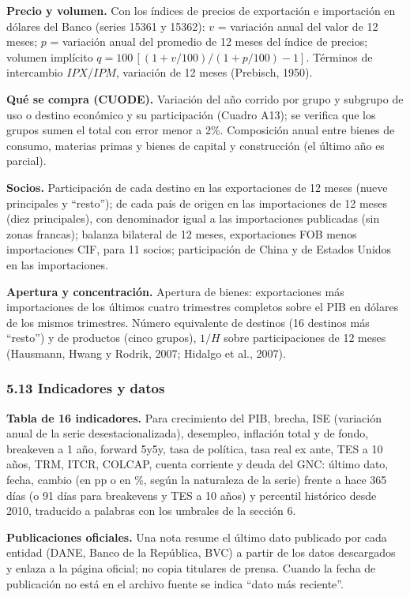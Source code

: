 \textbf{Precio y volumen.} Con los índices de precios de exportación e
importación en dólares del Banco (series 15361 y 15362): \(v\) =
variación anual del valor de 12 meses; \(p\) = variación anual del
promedio de 12 meses del índice de precios; volumen implícito
\(q=100\,[(1+v/100)/(1+p/100)-1]\). Términos de intercambio \(IPX/IPM\),
variación de 12 meses (Prebisch, 1950).

\textbf{Qué se compra (CUODE).} Variación del año corrido por grupo y
subgrupo de uso o destino económico y su participación (Cuadro A13); se
verifica que los grupos sumen el total con error menor a 2\%.
Composición anual entre bienes de consumo, materias primas y bienes de
capital y construcción (el último año es parcial).

\textbf{Socios.} Participación de cada destino en las exportaciones de
12 meses (nueve principales y ``resto''); de cada país de origen en las
importaciones de 12 meses (diez principales), con denominador igual a
las importaciones publicadas (sin zonas francas); balanza bilateral de
12 meses, exportaciones FOB menos importaciones CIF, para 11 socios;
participación de China y de Estados Unidos en las importaciones.

\textbf{Apertura y concentración.} Apertura de bienes: exportaciones más
importaciones de los últimos cuatro trimestres completos sobre el PIB en
dólares de los mismos trimestres. Número equivalente de destinos (16
destinos más ``resto'') y de productos (cinco grupos), \(1/H\) sobre
participaciones de 12 meses (Hausmann, Hwang y Rodrik, 2007; Hidalgo et
al., 2007).

\hypertarget{indicadores-y-datos}{%
\subsubsection{5.13 Indicadores y datos}\label{indicadores-y-datos}}

\textbf{Tabla de 16 indicadores.} Para crecimiento del PIB, brecha, ISE
(variación anual de la serie desestacionalizada), desempleo, inflación
total y de fondo, breakeven a 1 año, forward 5y5y, tasa de política,
tasa real ex ante, TES a 10 años, TRM, ITCR, COLCAP, cuenta corriente y
deuda del GNC: último dato, fecha, cambio (en pp o en \%, según la
naturaleza de la serie) frente a hace 365 días (o 91 días para
breakevens y TES a 10 años) y percentil histórico desde 2010, traducido
a palabras con los umbrales de la sección 6.

\textbf{Publicaciones oficiales.} Una nota resume el último dato
publicado por cada entidad (DANE, Banco de la República, BVC) a partir
de los datos descargados y enlaza a la página oficial; no copia
titulares de prensa. Cuando la fecha de publicación no está en el
archivo fuente se indica ``dato más reciente''.


